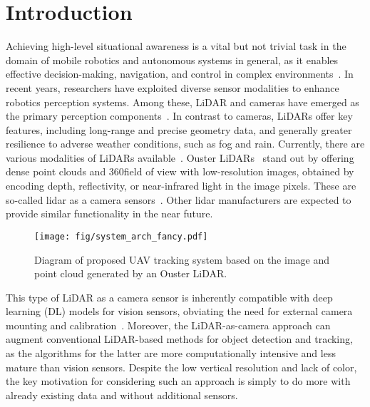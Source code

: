 
\section{Introduction}\label{sec:introduction}
\thispagestyle{FirstPage}

Achieving high-level situational awareness is a vital but %
not trivial task in the domain of mobile robotics and autonomous systems in general, as it enables effective decision-making, navigation, and control in %
complex environments~\cite{fan2019key}. In recent years, researchers have exploited diverse sensor modalities to enhance robotics perception systems. Among these, LiDAR and cameras have emerged as the primary perception components~\cite{kato2018autoware}. In contrast to cameras, LiDARs offer key features, including long-range and precise geometry data, and generally greater resilience to adverse weather conditions, such as fog and rain. 
Currently, there are various modalities of LiDARs available~\cite{qingqing2022multi}. Ouster LiDARs~\cite{tampuu2022lidar, angus2018lidar, xianjia2022analyzing} stand out by offering dense point clouds and 360\textdegree field of view with low-resolution images, obtained by encoding depth, reflectivity, or near-infrared light in the image pixels. These are so-called lidar as a camera sensors~\cite{tampuu2022lidar, xianjia2022analyzing}. Other lidar manufacturers are expected to provide similar functionality in the near future.

\begin{figure}[t]
    \centering
    \texttt{[image: fig/system\_arch\_fancy.pdf]}
    \caption{Diagram of proposed UAV tracking system based on the image and point cloud generated by an Ouster LiDAR.}
    \label{fig:concept}
\end{figure}

This type of LiDAR as a camera sensor is inherently compatible with deep learning (DL) models for vision sensors, obviating the need for external camera mounting and calibration~\cite{xianjia2022analyzing}. Moreover, the LiDAR-as-camera approach can augment conventional LiDAR-based methods for object detection and tracking, as the algorithms for the latter are more computationally intensive and less mature than vision sensors. Despite the low vertical resolution and lack of color, the key motivation for considering such an approach is simply to do more with already existing data and without additional sensors.

